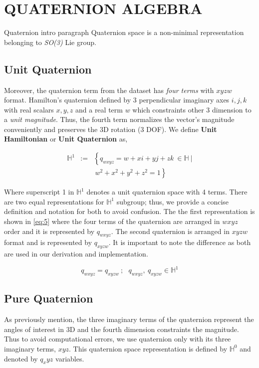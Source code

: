 \documentclass[letterpaper, 10 pt, conference]{ieeeconf}  %
\begin{document}
\section{QUATERNION ALGEBRA}

Quaternion intro paragraph
Quaternion space is a non-minimal representation belonging to \textit{SO(3)} Lie group.

\subsection{Unit Quaternion}
Moreover, the quaternion term from the dataset has \textit{four terms} with $xyzw$
format.
Hamilton's quaternion defined by 3 perpendicular imaginary axes $i,j,k$ with
real scalars $x,y,z$ and a real term $w$ which constraints other 3 dimension to
a \textit{unit magnitude}. Thus, the fourth term normalizes the vector's magnitude
conveniently and preserves the 3D rotation (3 DOF). We define \textbf{Unit Hamiltonian}
or \textbf{Unit Quaternion} as,


\begin{eqnarray}\nonumber
\label{eq:9}
\mathbb{H}^{1} &:=&\left\{ q_{wxyz}=w+xi+yj+zk~\in \mathbb{H}~| \right.\\
                   && \left.~w^{2}+x^{2}+y^{2}+z^{2}=1 \right\}
\end{eqnarray}

Where superscript 1 in $\mathbb{H}^{1}$ denotes a unit quaternion space with 4
terms. There are two equal representations for $\mathbb{H}^{1}$ subgroup; thus,
we provide a concise definition and notation for both to avoid confusion. The
the first representation is shown in \ref{eq:5} where the four terms of the
quaternion are arranged in $wxyz$ order and it is represented by $q_{wxyz}$.
The second quaternion is arranged in $xyzw$ format and is represented by $q_{xyzw}$.
It is important to note the difference as both are used in our derivation and
implementation.

\begin{equation}
\label{eq:10}
q_{wxyz} = q_{xyzw} ~; ~~~ q_{wxyz},~q_{xyzw} \in \mathbb{H}^{1}
\end{equation}


\subsection{Pure Quaternion}
As previously mention, the three imaginary terms of the quaternion represent the
angles of interest in 3D and the fourth dimension constraints the magnitude. Thus
to avoid computational errors, we use quaternion only with its three imaginary
terms, $xyz$.
This quaternion space representation is defined by $\mathbb{H}^{0}$ and
denoted by $q_xyz$ variables.
\end{document}

